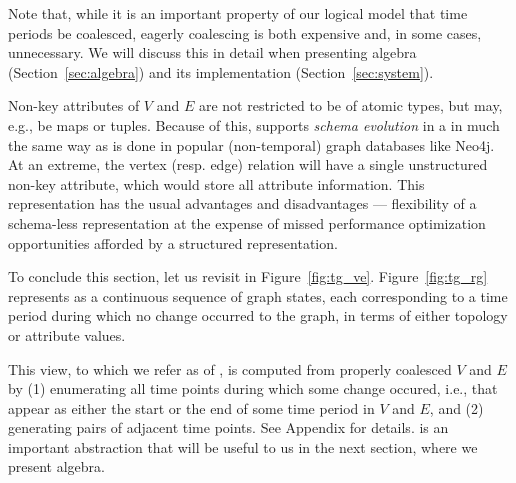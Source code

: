 Note that, while it is an important property of our logical model that
time periods be coalesced, eagerly coalescing is both expensive and,
in some cases, unnecessary.  We will discuss this in detail when
presenting \tg algebra (Section~\ref{sec:algebra}) and its
implementation (Section~\ref{sec:system}).

Non-key attributes of $V$ and $E$ are not restricted to be of atomic
types, but may, e.g., be maps or tuples.  Because of this, \ql
supports {\em schema evolution} in a \tg in much the same way as is
done in popular (non-temporal) graph databases like Neo4j.  At an
extreme, the vertex (resp. edge) relation will have a single
unstructured non-key attribute, which would store all attribute
information.  This representation has the usual advantages and
disadvantages --- flexibility of a schema-less representation at the
expense of missed performance optimization opportunities afforded by a
structured representation.

To conclude this section, let us revisit \tg {} in
Figure~\ref{fig:tg_ve}.  Figure~\ref{fig:tg_rg} represents  as a
continuous sequence of graph states, each corresponding to a time
period during which no change occurred to the graph, in terms of
either topology or attribute values.


This view, to which we refer as \rgs of , is computed from
properly coalesced $V$ and $E$ by (1) enumerating all time points
during which some change occured, i.e., that appear as either the
start or the end of some time period in $V$ and $E$, and (2)
generating pairs of adjacent time points. See Appendix for details.
\rgs is an important abstraction that will be useful to us in the next
section, where we present \tg algebra.

